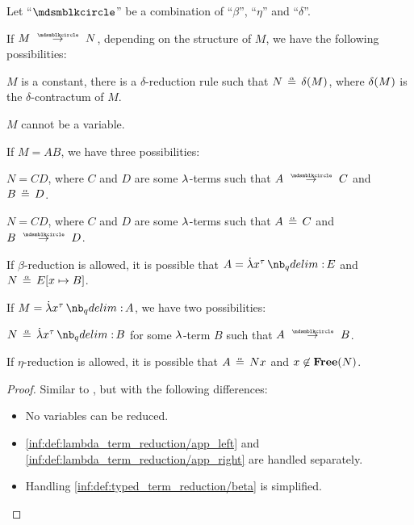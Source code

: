 \begin{lemma}\label{thm:single_step_reduction_deconstruction}
  Let \enquote{\( {\Anon} \)} be a combination of \enquote{\( \beta \)}, \enquote{\( \eta \)} and \enquote{\( \delta \)}.

  If \( M \pred N \), depending on the structure of \( M \), we have the following possibilities:
  \begin{thmenum}
     \( M \) is a constant, there is a \( \delta \)-reduction rule such that \( N \aequiv \op*{\delta}(M) \), where \( \op*{\delta}(M) \) is the \( \delta \)-contractum of \( M \).

     \( M \) cannot be a variable.

     If \( M = AB \), we have three possibilities:
    \begin{thmenum}
       \( N = CD \), where \( C \) and \( D \) are some \( {\mathrm \lambda} \)-terms such that \( A \pred C \) and \( B \aequiv D \).

       \( N = CD \), where \( C \) and \( D \) are some \( {\mathrm \lambda} \)-terms such that \( A \aequiv C \) and \( B \pred D \).

       If \( \beta \)-reduction is allowed, it is possible that \( A = \qabs {x^\tau} E \) and \( N \aequiv E[x \mapsto B] \).
    \end{thmenum}

     If \( M = \qabs {x^\tau} A \), we have two possibilities:
    \begin{thmenum}
       \( N \aequiv \qabs {x^\tau} B \) for some \( {\mathrm \lambda} \)-term \( B \) such that \( A \pred B \).

       If \( \eta \)-reduction is allowed, it is possible that \( A \aequiv Nx \) and \( x \not\in \op*{Free}(N) \).
    \end{thmenum}
  \end{thmenum}
\end{lemma}
\begin{proof}
  Similar to , but with the following differences:
  \begin{itemize}
    \item No variables can be reduced.
    \item \ref{inf:def:lambda_term_reduction/app_left} and \ref{inf:def:lambda_term_reduction/app_right} are handled separately.
    \item Handling \ref{inf:def:typed_term_reduction/beta} is simplified.
  \end{itemize}
\end{proof}

